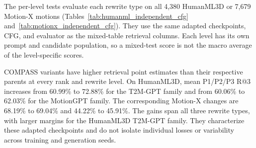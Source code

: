 The per-level tests evaluate each rewrite type on all 4,380 HumanML3D or
7,679 Motion-X motions (Tables~\ref{tab:humanml_independent_cfg}
and~\ref{tab:motionx_independent_cfg}). They use the same adapted checkpoints,
CFG, and evaluator as the mixed-table retrieval columns. Each level has its
own prompt and candidate population, so a mixed-test score is not the macro
average of the level-specific scores.

COMPASS variants have higher retrieval point estimates than their respective
parents at every rank and rewrite level. On HumanML3D, mean P1/P2/P3 R@3
increases from 60.99\% to 72.88\% for the T2M-GPT family and from 60.06\%
to 62.03\% for the MotionGPT family. The corresponding Motion-X changes are
68.19\% to 69.04\% and 44.22\% to 45.91\%. The gains span all three
rewrite types, with larger margins for the HumanML3D T2M-GPT family. They
characterize these adapted checkpoints and do not isolate individual losses
or variability across training and generation seeds.